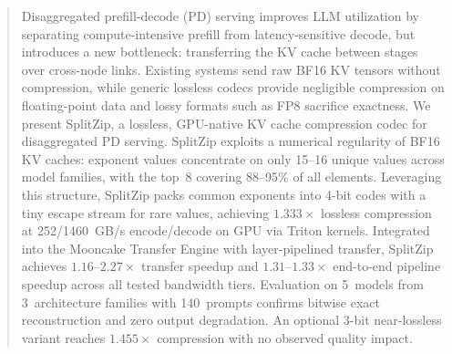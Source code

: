 \begin{abstract}\sloppy
Disaggregated prefill-decode (PD) serving improves LLM utilization by separating compute-intensive prefill from latency-sensitive decode, but introduces a new bottleneck: transferring the KV cache between stages over cross-node links. Existing systems send raw BF16 KV tensors without compression, while generic lossless codecs provide negligible compression on floating-point data and lossy formats such as FP8 sacrifice exactness.
We present SplitZip, a lossless, GPU-native KV cache compression codec for disaggregated PD serving. SplitZip exploits a numerical regularity of BF16 KV caches: exponent values concentrate on only 15--16 unique values across model families, with the top~8 covering 88--95\% of all elements. Leveraging this structure, SplitZip packs common exponents into 4-bit codes with a tiny escape stream for rare values, achieving $1.333\times$ lossless compression at 252/1460~GB/s encode/decode on GPU via Triton kernels. Integrated into the Mooncake Transfer Engine with layer-pipelined transfer, SplitZip achieves $1.16$--$2.27\times$ transfer speedup and $1.31$--$1.33\times$ end-to-end pipeline speedup across all tested bandwidth tiers. Evaluation on 5~models from 3~architecture families with 140~prompts confirms bitwise exact reconstruction and zero output degradation. An optional 3-bit near-lossless variant reaches $1.455\times$ compression with no observed quality impact.
\end{abstract}
